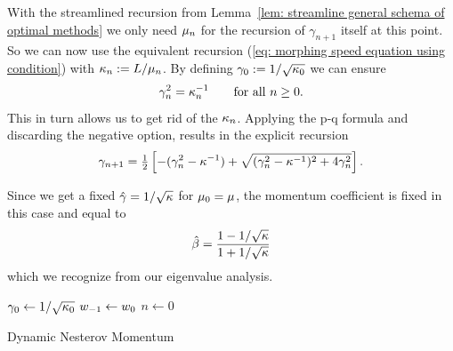 With the streamlined recursion from Lemma~\ref{lem: streamline general schema of optimal methods}
we only need \(\mu_n\) for the recursion of \(\gamma_{n+1}\) itself at this
point. So we can now use the equivalent recursion (\ref{eq: morphing speed
equation using condition}) with \(\kappa_n:=L/\mu_n\).
By defining \(\gamma_0:=1/\sqrt{\kappa_0}\) we can ensure
\begin{align*}
	\gamma_n^2 = \kappa_n^{-1} \qquad  \text{for all } n\ge0.
\end{align*}
This in turn allows us to get rid of the \(\kappa_n\). Applying the p-q
formula and discarding the negative option, results in the explicit recursion
\begin{align*}
	\gamma_{n+1}
	= \tfrac12 \left[
		-(\gamma_n^2 - \kappa^{-1})
		+ \sqrt{(\gamma_n^2 - \kappa^{-1})^2 + 4 \gamma_n^2}
	\right].
\end{align*}

Since we get a fixed \(\hat{\gamma}=1/\sqrt{\kappa}\) for
\(\mu_0=\mu\), the momentum coefficient is fixed in this case and equal to 
\begin{align*}
	\hat{\beta} = \frac{1-1/\sqrt{\kappa}}{1+1/\sqrt{\kappa}}
\end{align*}
which we recognize from our eigenvalue analysis.

\begin{algorithm}
	\(\gamma_0 \leftarrow 1/\sqrt{\kappa_0}\)
	\(w_{-1} \leftarrow w_0\)\;
	\(n\leftarrow 0\)\;
	\caption{Dynamic Nesterov Momentum\label{algo: dynamic nesterov momentum}}
\end{algorithm}


